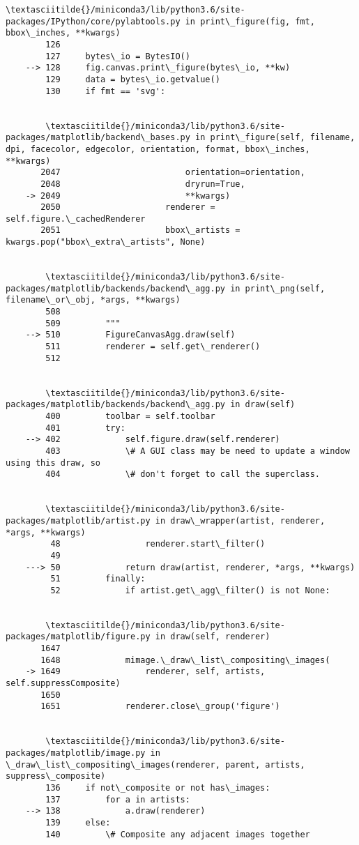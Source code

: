 \documentclass[11pt]{article}
\begin{document}
\begin{Verbatim}[commandchars=\\\{\}]
        \textasciitilde{}/miniconda3/lib/python3.6/site-packages/IPython/core/pylabtools.py in print\_figure(fig, fmt, bbox\_inches, **kwargs)
        126 
        127     bytes\_io = BytesIO()
    --> 128     fig.canvas.print\_figure(bytes\_io, **kw)
        129     data = bytes\_io.getvalue()
        130     if fmt == 'svg':


        \textasciitilde{}/miniconda3/lib/python3.6/site-packages/matplotlib/backend\_bases.py in print\_figure(self, filename, dpi, facecolor, edgecolor, orientation, format, bbox\_inches, **kwargs)
       2047                         orientation=orientation,
       2048                         dryrun=True,
    -> 2049                         **kwargs)
       2050                     renderer = self.figure.\_cachedRenderer
       2051                     bbox\_artists = kwargs.pop("bbox\_extra\_artists", None)


        \textasciitilde{}/miniconda3/lib/python3.6/site-packages/matplotlib/backends/backend\_agg.py in print\_png(self, filename\_or\_obj, *args, **kwargs)
        508 
        509         """
    --> 510         FigureCanvasAgg.draw(self)
        511         renderer = self.get\_renderer()
        512 


        \textasciitilde{}/miniconda3/lib/python3.6/site-packages/matplotlib/backends/backend\_agg.py in draw(self)
        400         toolbar = self.toolbar
        401         try:
    --> 402             self.figure.draw(self.renderer)
        403             \# A GUI class may be need to update a window using this draw, so
        404             \# don't forget to call the superclass.


        \textasciitilde{}/miniconda3/lib/python3.6/site-packages/matplotlib/artist.py in draw\_wrapper(artist, renderer, *args, **kwargs)
         48                 renderer.start\_filter()
         49 
    ---> 50             return draw(artist, renderer, *args, **kwargs)
         51         finally:
         52             if artist.get\_agg\_filter() is not None:


        \textasciitilde{}/miniconda3/lib/python3.6/site-packages/matplotlib/figure.py in draw(self, renderer)
       1647 
       1648             mimage.\_draw\_list\_compositing\_images(
    -> 1649                 renderer, self, artists, self.suppressComposite)
       1650 
       1651             renderer.close\_group('figure')


        \textasciitilde{}/miniconda3/lib/python3.6/site-packages/matplotlib/image.py in \_draw\_list\_compositing\_images(renderer, parent, artists, suppress\_composite)
        136     if not\_composite or not has\_images:
        137         for a in artists:
    --> 138             a.draw(renderer)
        139     else:
        140         \# Composite any adjacent images together



\end{Verbatim}
\end{document}
